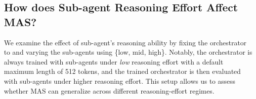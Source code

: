 









\subsection{How does Sub-agent Reasoning Effort Affect MAS?}
\label{sec:reasoning_sub_agent}
We examine the effect of
sub-agent's reasoning ability by fixing the orchestrator to \qwen and varying the
sub-agents using \ossonetwenty \{low, mid, high\}. Notably, the orchestrator is always trained with sub-agents under
\textit{low} reasoning effort {with a default maximum length of 512 tokens}, and the trained orchestrator is then evaluated
with sub-agents under higher reasoning effort. This setup allows us to assess
whether MAS can generalize across different reasoning-effort regimes. 

